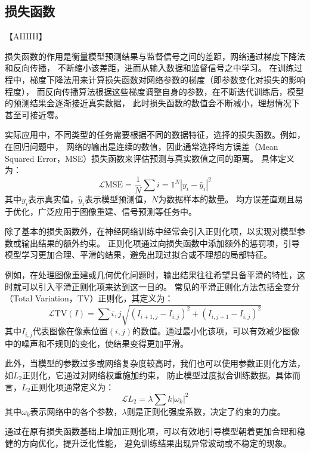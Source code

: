\subsection{损失函数}【AIIIIII】

损失函数的作用是衡量模型预测结果与监督信号之间的差距，网络通过梯度下降法和反向传播，
不断缩小该差距，进而从输入数据和监督信号之中学习。
在训练过程中，梯度下降法用来计算损失函数对网络参数的梯度（即参数变化对损失的影响程度），
而反向传播算法根据这些梯度调整自身的参数，在不断迭代训练后，模型的预测结果会逐渐接近真实数据，
此时损失函数的数值会不断减小，理想情况下甚至可接近零。

实际应用中，不同类型的任务需要根据不同的数据特征，选择的损失函数。例如，在回归问题中，
网络的输出是连续的数值，因此通常选择均方误差（Mean Squared Error，MSE）损失函数来评估预测与真实数值之间的距离。
具体定义为：
\begin{equation} 
  \mathcal{L}{\text{MSE}}=\frac{1}{N}\sum{i=1}^{N}\left|y_i - \hat{y}_i\right|^2 
\end{equation}
其中$y_i$表示真实值，$\hat{y}_i$表示模型预测值，$N$为数据样本的数量。
均方误差直观且易于优化，广泛应用于图像重建、信号预测等任务中。

除了基本的损失函数外，在神经网络训练中经常会引入正则化项，以实现对模型参数或输出结果的额外约束。
正则化项通过向损失函数中添加额外的惩罚项，引导模型学习更加合理、平滑的结果，避免出现过拟合或不理想的局部特征。

例如，在处理图像重建或几何优化问题时，输出结果往往希望具备平滑的特性，这时就可以引入平滑正则化项来达到这一目的。
常见的平滑正则化方法包括全变分（Total Variation，TV）正则化，其定义为：
\begin{equation} 
  \mathcal{L}{\text{TV}}(I)=\sum{i,j}\sqrt{\left(I_{i+1,j}-I_{i,j}\right)^2+\left(I_{i,j+1}-I_{i,j}\right)^2} 
\end{equation} 
其中$I_{i,j}$代表图像在像素位置$(i,j)$的数值。通过最小化该项，可以有效减少图像中的噪声和不规则的变化，使结果变得更加平滑。

此外，当模型的参数过多或网络复杂度较高时，我们也可以使用参数正则化方法，如$L_2$正则化，它通过对网络权重施加约束，
防止模型过度拟合训练数据。具体而言，$L_2$正则化项通常定义为： \begin{equation} \mathcal{L}{L_2}=\lambda\sum{k}\left|\omega_k\right|^2 \end{equation} 其中$\omega_k$表示网络中的各个参数，$\lambda$则是正则化强度系数，决定了约束的力度。

通过在原有损失函数基础上增加正则化项，可以有效地引导模型朝着更加合理和稳健的方向优化，提升泛化性能，
避免训练结果出现异常波动或不稳定的现象。

